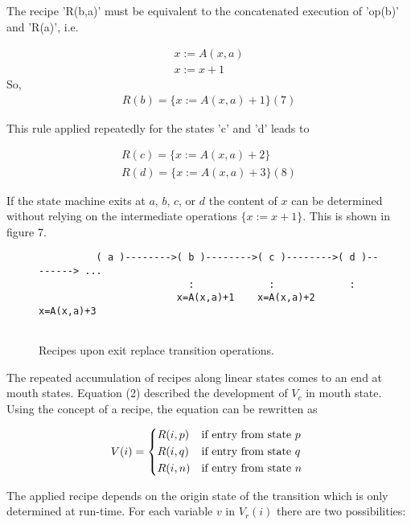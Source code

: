 \documentclass[12pt,a4paper]{scrartcl}
\begin{document}
The recipe 'R(b,a)' must be equivalent to the concatenated execution of 'op(b)'
and 'R(a)', i.e.

\begin{eqnarray}
    { x  :=  A(x,a) } \\
    { x  :=  x + 1 }
\end{eqnarray}
So, 
\begin{eqnarray}
    R(b)  =  \{ x := A(x,a) + 1 \}                                 (7)
\end{eqnarray}

This rule applied repeatedly for the states 'c' and 'd' leads to

\begin{eqnarray}
    R(c)  =  \{ x := A(x,a) + 2 \} \\
    R(d)  =  \{ x := A(x,a) + 3 \}                                 (8)
\end{eqnarray}

If the state machine exits at $a$, $b$, $c$, or $d$ the content of $x$ can be
determined without relying on the intermediate operations $\{ x:=x+1 \}$. This
is shown in figure 7.
 
\begin{figure}[htbp] \leavevmode
\begin{verbatim}
          ( a )-------->( b )-------->( c )-------->( d )--------> ...
                          :             :             :
                        x=A(x,a)+1    x=A(x,a)+2    x=A(x,a)+3


\end{verbatim}
\caption{Recipes upon exit replace transition operations.}
\end{figure}

The repeated accumulation of recipes along linear states comes to an end at
mouth states.  Equation (2) described the development of $V_c$ in mouth
state. Using the concept of a recipe, the equation can be rewritten as

\begin{eqnarray}
    V(i)  =  \begin{dcases*}
               R(i,p) &  if entry from state $p$ \\
               R(i,q) &  if entry from state $q$ \\
               R(i,n) &  if entry from state $n$
            \end{dcases*}
\end{eqnarray}

The applied recipe depends on the origin state of the transition which is only
determined at run-time.  For each variable $v$ in $V_r(i)$ there are two
possibilities:
\end{document}
